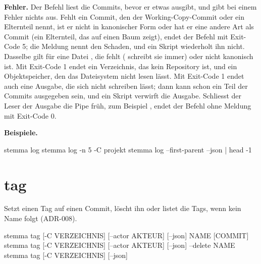 {\bf Fehler.} Der Befehl liest die Commits, bevor er etwas ausgibt, und gibt bei einem Fehler
nichts aus. Fehlt ein Commit, den der Working-Copy-Commit oder ein Elternteil nennt, ist er nicht in
kanonischer Form oder hat er eine andere Art als Commit (ein Elternteil, das auf einen Baum
zeigt), endet der Befehl mit Exit-Code 5; die Meldung nennt den Schaden,
und ein Skript wiederholt ihn nicht. Dasselbe gilt für eine Datei ,
die fehlt ( schreibt sie immer) oder nicht kanonisch ist.
Mit Exit-Code 1 endet ein Verzeichnis, das kein Repository ist, und ein Objektspeicher,
den das Dateisystem nicht lesen lässt.
Mit Exit-Code 1 endet auch eine Ausgabe, die sich nicht schreiben lässt;
dann kann schon ein Teil der Commits ausgegeben sein, und ein Skript verwirft die Ausgabe.
Schliesst der Leser der Ausgabe die Pipe früh, zum Beispiel ,
endet der Befehl ohne Meldung mit Exit-Code 0.

{\bf Beispiele.}

\starttyping
stemma log
stemma log -n 5 -C projekt
stemma log --first-parent --json | head -1
\stoptyping

\section{tag}

Setzt einen Tag auf einen Commit, löscht ihn oder listet die Tags, wenn kein Name folgt
(ADR-008).

\starttyping
stemma tag [-C VERZEICHNIS] [--actor AKTEUR] [--json] NAME [COMMIT]
stemma tag [-C VERZEICHNIS] [--actor AKTEUR] [--json] --delete NAME
stemma tag [-C VERZEICHNIS] [--json]
\stoptyping

